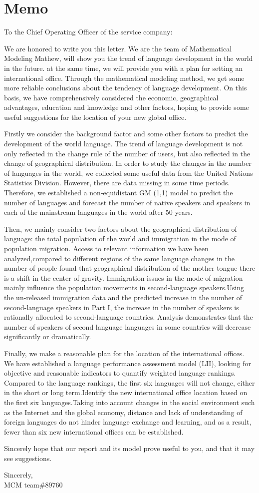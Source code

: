 \newpage
\section{Memo}
\noindent
To the Chief Operating Officer of the service company:

We are honored to write you this letter. We are the team of Mathematical Modeling Mathew, will show you the trend of language development in the world in the future. at the same time, we will provide you with a plan for setting an international office.  Through the mathematical modeling method, we get some more reliable conclusions about the tendency of language development. On this basis, we have comprehensively considered the economic, geographical advantages, education and knowledge and other factors, hoping to provide some useful suggestions for the location of your new global office.

Firstly we consider the background factor and some other factors to predict the development of the world language. The trend of language development is not only reflected in the change rule of the number of users, but also reflected in the change of geographical distribution. In order to study the changes in the number of languages in the world, we collected some useful data from the United Nations Statistics Division. However, there are data missing in some time periods. Therefore, we established a non-equidistant GM (1,1) model to predict the number of languages and forecast the number of native speakers and speakers in each of the mainstream languages in the world after 50 years.

Then, we mainly consider two factors about the geographical distribution of language: the total population of the world and immigration in the mode of population migration. Access to relevant information we have been analyzed,compared to different regions of the same language changes in the number of people found that geographical distribution of the mother tongue there is a shift in the center of gravity.
Immigration issues in the mode of migration mainly influence the population movements in second-language speakers.Using the un-released immigration data and the predicted increase in the number of second-language speakers in Part I, the increase in the number of speakers is rationally allocated to second-language countries. Analysis demonstrates that the number of speakers of second language languages in some countries will decrease significantly or dramatically.

Finally, we make a reasonable plan for the location of the international offices. We have established a language performance assessment model (LII), looking for objective and reasonable indicators to quantify weighted language rankings. Compared to the language rankings, the first six languages will not change, either in the short or long term.Identify the new international office location based on the first six languages.Taking into account changes in the social environment such as the Internet and the global economy, distance and lack of understanding of foreign languages do not hinder language exchange and learning, and as a result, fewer than six new international offices can be established.

 Sincerely hope that our report and its model prove useful to you, and that it may see suggestions.
\par
\noindent 
 Sincerely, \\
\noindent MCM team\#89760


